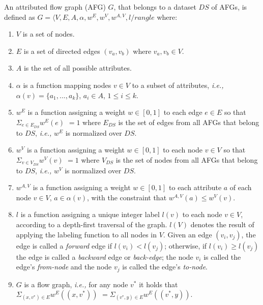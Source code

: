 \def\eg{{\it e.g., \/}}
\def\ie{{\it i.e., \/}}
\def\etal{{\it et al.\/}}
\def\viz{{\it viz.,\/ }}

An attributed flow graph (AFG) $G$, that belongs to a dataset $DS$ of AFGs, is defined as $G = \langle V, E, A, \alpha, w^E, w^V, w^{A,V}, l /rangle$ where:

\begin{enumerate}
\item $V$ is a set of nodes.

\item $E$ is a set of directed edges $(v_a, v_b)$ where $v_a, v_b \in V$.

\item $A$ is the set of all possible attributes.

\item $\alpha$ is a function mapping nodes $v \in V$ to a subset of attributes, \ie $\alpha(v) = \{a_1, ..., a_k\}$,  $a_i \in A$, $1 \leq i \leq k$.

\item $w^E$ is a function assigning a weight $w \in [0,1]$ to each edge $e \in E$ so that $\Sigma_{e \in E_{DS}}w^E(e)$ $ = 1$ where $E_{DS}$ is the set of edges from all AFGs that belong to $DS$, \ie $w^E$ is normalized over $DS$.  

\item $w^V$ is a function assigning a weight $w \in [0,1]$ to each node $v \in V$ so that $\Sigma_{v \in V_{DS}}w^V(v)$ $ = 1$ where $V_{DS}$ is the set of nodes from all AFGs that belong to $DS$, \ie $w^V$ is normalized over $DS$.

\item $w^{A,V}$ is a function assigning a weight $w \in [0,1]$ to each attribute $a$ of each node $v \in V$, $a \in \alpha(v)$, with the constraint that $w^{A,V}(a) \leq w^V(v)$.

\item $l$ is a function assigning a unique integer label $l(v)$ to each node $v \in V$, according to a depth-first traversal of the graph. $l(V)$ denotes the result of applying the labeling function to all nodes in $V$. Given an edge $(v_i, v_j)$, the edge is called a \emph{forward} edge if $l(v_i) < l(v_j)$; otherwise, if $l(v_i) \geq l(v_j)$ the edge is called a \emph{backward} edge or \emph{back-edge}; the node $v_i$ is called the edge's \emph{from-node} and the node $v_j$ is called the edge's \emph{to-node}.   

\item $G$ is a flow graph, \ie for any node $v^*$ it holds that
$\Sigma_{(x, v^*) \in E}w^E((x, v^*))$ $= \Sigma_{(v^*, y) \in E}w^E((v^*, y))$.

\end{enumerate}

